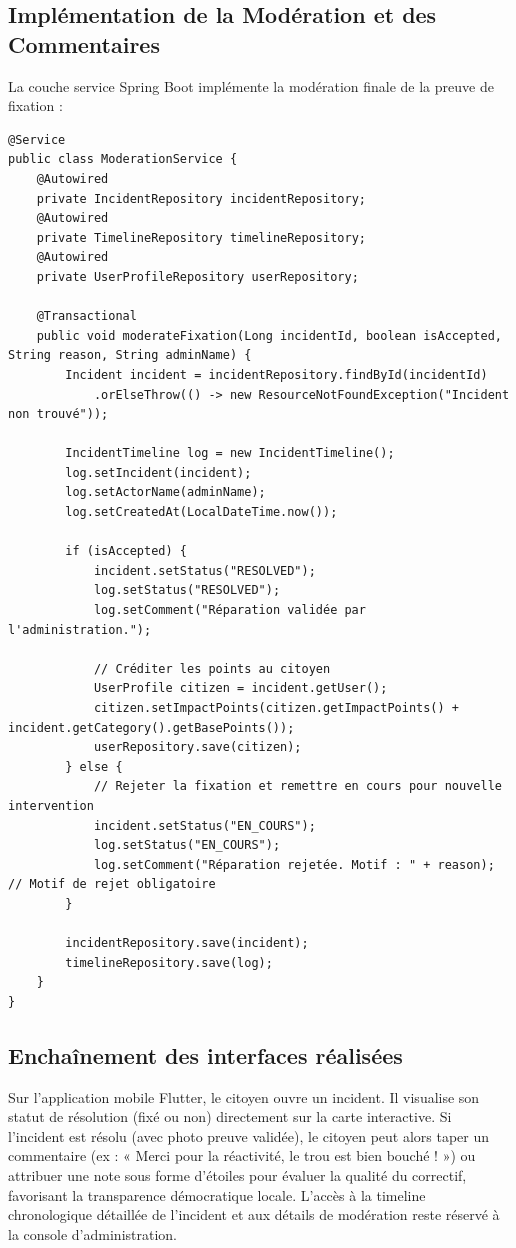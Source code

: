 \subsection{Implémentation de la Modération et des Commentaires}
La couche service Spring Boot implémente la modération finale de la preuve de fixation :
\begin{verbatim}
@Service
public class ModerationService {
    @Autowired
    private IncidentRepository incidentRepository;
    @Autowired
    private TimelineRepository timelineRepository;
    @Autowired
    private UserProfileRepository userRepository;

    @Transactional
    public void moderateFixation(Long incidentId, boolean isAccepted, String reason, String adminName) {
        Incident incident = incidentRepository.findById(incidentId)
            .orElseThrow(() -> new ResourceNotFoundException("Incident non trouvé"));

        IncidentTimeline log = new IncidentTimeline();
        log.setIncident(incident);
        log.setActorName(adminName);
        log.setCreatedAt(LocalDateTime.now());

        if (isAccepted) {
            incident.setStatus("RESOLVED");
            log.setStatus("RESOLVED");
            log.setComment("Réparation validée par l'administration.");
            
            // Créditer les points au citoyen
            UserProfile citizen = incident.getUser();
            citizen.setImpactPoints(citizen.getImpactPoints() + incident.getCategory().getBasePoints());
            userRepository.save(citizen);
        } else {
            // Rejeter la fixation et remettre en cours pour nouvelle intervention
            incident.setStatus("EN_COURS");
            log.setStatus("EN_COURS");
            log.setComment("Réparation rejetée. Motif : " + reason); // Motif de rejet obligatoire
        }
        
        incidentRepository.save(incident);
        timelineRepository.save(log);
    }
}
\end{verbatim}

\subsection{Enchaînement des interfaces réalisées}
Sur l'application mobile Flutter, le citoyen ouvre un incident. Il visualise son statut de résolution (fixé ou non) directement sur la carte interactive. Si l'incident est résolu (avec photo preuve validée), le citoyen peut alors taper un commentaire (ex : « Merci pour la réactivité, le trou est bien bouché ! ») ou attribuer une note sous forme d'étoiles pour évaluer la qualité du correctif, favorisant la transparence démocratique locale. L'accès à la timeline chronologique détaillée de l'incident et aux détails de modération reste réservé à la console d'administration.

